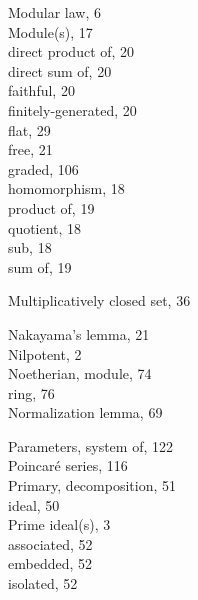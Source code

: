 
{\setlength{\parindent}{0pt}
\noindent\begin{minipage}[t]{0.46\textwidth}
Modular law, 6\\
Module(s), 17\\
\hspace*{1.5em}direct product of, 20\\
\hspace*{1.5em}direct sum of, 20\\
\hspace*{1.5em}faithful, 20\\
\hspace*{1.5em}finitely-generated, 20\\
\hspace*{1.5em}flat, 29\\
\hspace*{1.5em}free, 21\\
\hspace*{1.5em}graded, 106\\
\hspace*{1.5em}homomorphism, 18\\
\hspace*{1.5em}product of, 19\\
\hspace*{1.5em}quotient, 18\\
\hspace*{1.5em}sub, 18\\
\hspace*{1.5em}sum of, 19

\medskip
Multiplicatively closed set, 36

\medskip
Nakayama's lemma, 21\\
Nilpotent, 2\\
Noetherian, module, 74\\
\hspace*{1.5em}ring, 76\\
Normalization lemma, 69

\medskip
Parameters, system of, 122\\
Poincar\'e series, 116\\
Primary, decomposition, 51\\
\hspace*{1.5em}ideal, 50\\
Prime ideal(s), 3\\
\hspace*{1.5em}associated, 52\\
\hspace*{1.5em}embedded, 52\\
\hspace*{1.5em}isolated, 52


\end{minipage}}

